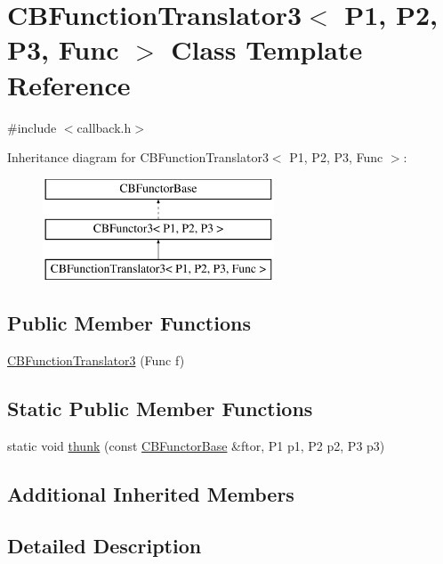\hypertarget{class_c_b_function_translator3}{\section{C\+B\+Function\+Translator3$<$ P1, P2, P3, Func $>$ Class Template Reference}
\label{class_c_b_function_translator3}
}


{\ttfamily \#include $<$callback.\+h$>$}

Inheritance diagram for C\+B\+Function\+Translator3$<$ P1, P2, P3, Func $>$\+:\begin{figure}[H]
\begin{center}
\leavevmode
\includegraphics[height=3.000000cm]{class_c_b_function_translator3}
\end{center}
\end{figure}
\subsection*{Public Member Functions}
\begin{DoxyCompactItemize}
\item 
\hyperlink{class_c_b_function_translator3_a59d1209449916b44b8ff86c0101c2df8}{C\+B\+Function\+Translator3} (Func f)
\end{DoxyCompactItemize}
\subsection*{Static Public Member Functions}
\begin{DoxyCompactItemize}
\item 
static void \hyperlink{class_c_b_function_translator3_a5460798da25c1e51d51bdad9a8e79f57}{thunk} (const \hyperlink{class_c_b_functor_base}{C\+B\+Functor\+Base} \&ftor, P1 p1, P2 p2, P3 p3)
\end{DoxyCompactItemize}
\subsection*{Additional Inherited Members}


\subsection{Detailed Description}
